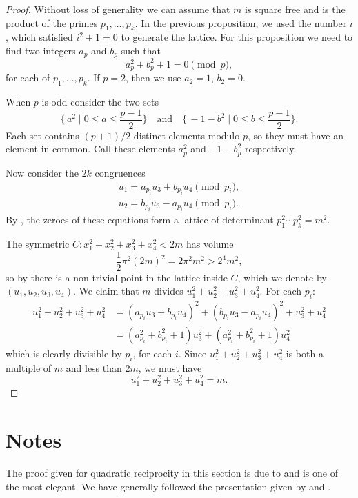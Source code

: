 \begin{proof}
Without loss of generality we can assume that $m$ is square free and
is the product of the primes $p_1, \ldots, p_k$.  In the previous
proposition, we used the number $i$, which satisfied $i^2+1 = 0$ to
generate the lattice.  For this proposition we need to find two
integers $a_p$ and $b_p$ such that
\[
a_p^2 + b_p^2 + 1 = 0 \pmod{p},
\]
for each of $p_1, \ldots, p_k$.  If $p = 2$, then we use $a_2 = 1$,
$b_2 = 0$.

When $p$ is odd consider the two sets
\[
\{\,a^2 \mid 0 \le a \le \frac{p-1}{2}\}
\quad\mbox{and}\quad
\{\,-1 - b^2 \mid 0 \le b \le \frac{p-1}{2}\}.
\]
Each set contains $(p+1)/2$ distinct elements modulo $p$, so they must
have an element in common.  Call these elements $a_p^2$ and $-1
-b_p^2$ respectively.

Now consider the $2k$ congruences
\[
\begin{aligned}
   u_1 = a_{p_i} u_3 + b_{p_i} u_4 \pmod{p_i}, \\
   u_2 = b_{p_i} u_3 - a_{p_i} u_4 \pmod{p_i}.
\end{aligned}
\]
By , the zeroes of these equations form a
lattice of determinant $p_1^2 \cdots p_k^2 = m^2$.

The symmetric  $C: x_1^2 + x_2^2 + x_3^2 + x_4^2 < 2m$ has
volume 
\[
\frac{1}{2} \pi^2 (2m)^2 = 2\pi^2 m^2 > 2^4 m^2,
\]
so by  there is a non-trivial point in
the lattice inside $C$, which we denote by $(u_1, u_2, u_3, u_4)$.  We
claim that $m$ divides $u_1^2 + u_2^2 + u_3^2 + u_4^2$.  For each $p_i$:
\[
\begin {aligned}
  u_1^2 + u_2^2 + u_3^2 + u_4^2
    & = (a_{p_i} u_3 + b_{p_i} u_4)^2 + (b_{p_i} u_3 - a_{p_i} u_4)^2
+ u_3^2 + u_4^2 \\
    & = (a_{p_i}^2 + b_{p_i}^2 + 1) u_3^2 + 
        (a_{p_i}^2 + b_{p_i}^2 + 1) u_4^2
\end{aligned}
\]
which is clearly divisible by $p_i$, for each $i$.  Since
$u_1^2+u_2^2+u_3^2+u_4^2$ is both a multiple of $m$ and less than
$2m$, we must have
\[
u_1^2+u_2^2+u_3^2+u_4^2 = m.
\]
\end{proof}

\section*{Notes}

\small

 The proof given for quadratic
reciprocity in this section is due to {\Eisenstein}
\cite{Eisenstein:QR} and is one of the most elegant.  We have 
generally followed the presentation given by {\Ireland} and {\Rosen}
\cite{Ireland:Rosen}.

